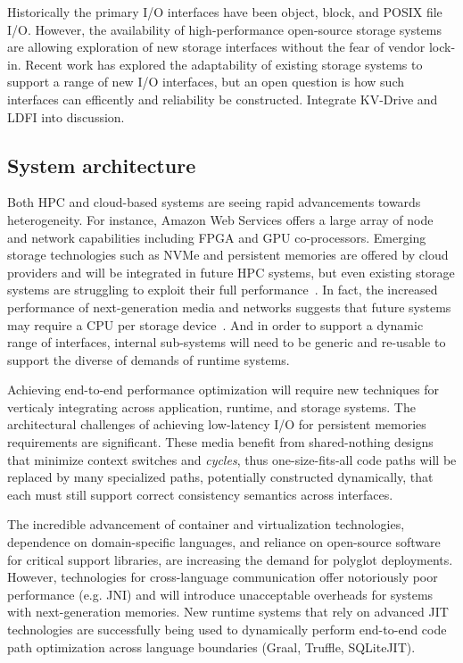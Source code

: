 \documentclass{sig-alternate-05-2015}
\begin{document}
Historically the primary I/O interfaces have been object, block, and POSIX file
I/O. However, the availability of high-performance open-source storage systems
are allowing exploration of new storage interfaces without the fear of vendor
lock-in.  Recent work has explored the adaptability of existing storage systems
to support a range of new I/O interfaces, but an open question is how such
interfaces can efficently and reliability be constructed. Integrate KV-Drive and
LDFI into discussion.

\subsection{System architecture}

Both HPC and cloud-based systems are seeing rapid advancements towards
heterogeneity. For instance, Amazon Web Services offers a large array of node
and network capabilities including FPGA and GPU co-processors. Emerging storage
technologies such as NVMe and persistent memories are offered by cloud providers
and will be integrated in future HPC systems, but even existing storage systems
are struggling to exploit their full performance~\cite{xu:fast16-nova}. In fact, the increased
performance of next-generation media and networks suggests that future systems
may require a CPU per storage device~\cite{samuels:oss16}. And in order to support a
dynamic range of interfaces, internal sub-systems will need to be generic and
re-usable to support the diverse of demands of runtime systems.

Achieving end-to-end performance optimization will require new techniques for
verticaly integrating across application, runtime, and storage systems. The
architectural challenges of achieving low-latency I/O for persistent memories
requirements are significant. These media benefit from shared-nothing designs
that minimize context switches and \emph{cycles}, thus one-size-fits-all code
paths will be replaced by many specialized paths, potentially constructed
dynamically, that each must still support correct consistency semantics across
interfaces.

The incredible advancement of container and virtualization technologies,
dependence on domain-specific languages, and reliance on open-source software
for critical support libraries, are increasing the demand for polyglot
deployments. However, technologies for cross-language communication offer
notoriously poor performance (e.g. JNI) and will introduce unacceptable
overheads for systems with next-generation memories. New runtime systems that
rely on advanced JIT technologies are successfully being used to dynamically
perform end-to-end code path optimization across language boundaries (Graal,
Truffle, SQLiteJIT).
\end{document}

